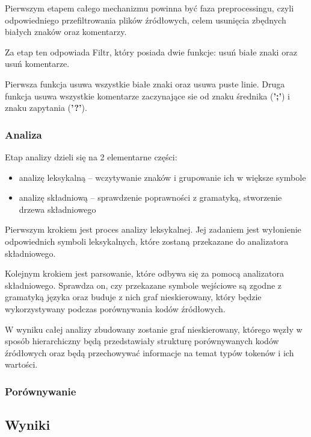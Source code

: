 \documentclass[a4paper,12pt]{article}
\begin{document}
Pierwszym etapem całego mechanizmu powinna być faza preprocessingu, czyli odpowiedniego przefiltrowania plików źródłowych, celem usunięcia zbędnych białych znaków oraz komentarzy.

Za etap ten odpowiada Filtr, który posiada dwie funkcje: usuń białe znaki oraz usuń komentarze.

Pierwsza funkcja usuwa wszystkie białe znaki oraz usuwa puste linie. Druga funkcja usuwa wszystkie komentarze zaczynające sie od znaku średnika (\textbf{';'}) i znaku zapytania (\textbf{'?'}).

\subsubsection{Analiza}

Etap analizy dzieli się na 2 elementarne części:
\begin{itemize}
\item analizę leksykalną – wczytywanie znaków i grupowanie ich w większe symbole
\item analizę składniową – sprawdzenie poprawności z gramatyką, stworzenie drzewa składniowego 
\end{itemize}

Pierwszym krokiem jest proces analizy leksykalnej. Jej zadaniem jest wyłonienie odpowiednich symboli leksykalnych, które zostaną przekazane do analizatora składniowego.

Kolejnym krokiem jest parsowanie, które odbywa się za pomocą analizatora składniowego. Sprawdza on, czy przekazane symbole wejściowe są zgodne z gramatyką języka oraz buduje z nich graf nieskierowany, który będzie wykorzystywany podczas porównywania kodów źródłowych.

W wyniku całej analizy zbudowany zostanie graf nieskierowany, którego węzły w sposób hierarchiczny będą przedstawiały strukturę porównywanych kodów źródłowych oraz będą przechowywać informacje na temat typów tokenów i ich wartości.

\subsubsection{Porównywanie}

\newpage

\subsection{Wyniki}

\newpage
\end{document}

